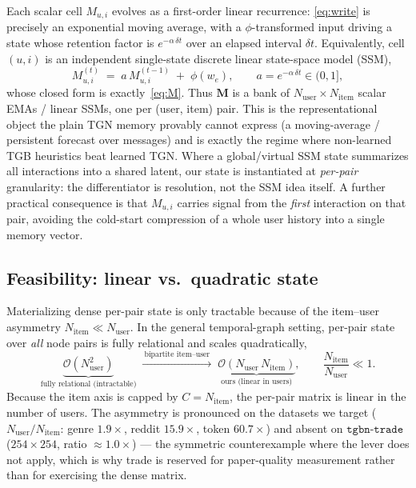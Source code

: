 \documentclass[11pt]{article}
\begin{document}
Each scalar cell $M_{u,i}$ evolves as a first-order linear recurrence:
\eqref{eq:write} is precisely an exponential moving average, with a
$\phi$-transformed input driving a state whose retention factor is
$e^{-\alpha\,\delta t}$ over an elapsed interval $\delta t$. Equivalently, cell
$(u,i)$ is an independent single-state discrete linear state-space model (SSM),
\begin{equation}
M_{u,i}^{(t)} \;=\; a\, M_{u,i}^{(t-1)} \;+\; \phi(w_e),
\qquad
a = e^{-\alpha\,\delta t}\in(0,1],
\label{eq:ssm}
\end{equation}
whose closed form is exactly~\eqref{eq:M}. Thus $\mathbf{M}$ is a bank of
$N_{\text{user}}\times N_{\text{item}}$ scalar EMAs / linear SSMs, one per
(user, item) pair. This is the representational object the plain TGN memory
provably cannot express (a moving-average / persistent forecast over messages)
and is exactly the regime where non-learned TGB heuristics beat learned TGN.
Where a global/virtual SSM state summarizes all interactions into a shared latent,
our state is instantiated at \emph{per-pair} granularity: the differentiator is
resolution, not the SSM idea itself. A further practical consequence is that
$M_{u,i}$ carries signal from the \emph{first} interaction on that pair, avoiding
the cold-start compression of a whole user history into a single memory vector.

\subsection{Feasibility: linear vs.\ quadratic state}
\label{subsec:feasibility}

Materializing dense per-pair state is only tractable because of the item--user
asymmetry $N_{\text{item}}\ll N_{\text{user}}$. In the general temporal-graph
setting, per-pair state over \emph{all} node pairs is fully relational and scales
quadratically,
\begin{equation}
\underbrace{\mathcal{O}\!\left(N_{\text{user}}^{2}\right)}_{\text{fully relational (intractable)}}
\;\xrightarrow{\ \text{bipartite item--user}\ }\;
\underbrace{\mathcal{O}\!\left(N_{\text{user}}\, N_{\text{item}}\right)}_{\text{ours (linear in users)}},
\qquad
\frac{N_{\text{item}}}{N_{\text{user}}}\ll 1 .
\label{eq:complexity}
\end{equation}
Because the item axis is capped by $C=N_{\text{item}}$, the per-pair matrix is
linear in the number of users. The asymmetry is pronounced on the datasets we
target ($N_{\text{user}}/N_{\text{item}}$: genre $1.9\times$, reddit $15.9\times$,
token $60.7\times$) and absent on $\texttt{tgbn-trade}$
($254{\times}254$, ratio $\approx 1.0\times$) --- the symmetric counterexample
where the lever does not apply, which is why trade is reserved for
paper-quality measurement rather than for exercising the dense matrix.
\end{document}
